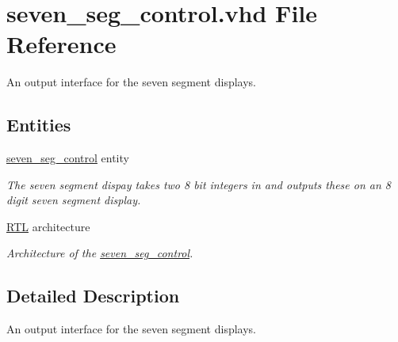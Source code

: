 \hypertarget{seven__seg__control_8vhd}{\section{seven\-\_\-seg\-\_\-control.\-vhd File Reference}
\label{seven__seg__control_8vhd}
}


An output interface for the seven segment displays.  


\subsection*{Entities}
\begin{DoxyCompactItemize}
\item 
\hyperlink{classseven__seg__control}{seven\-\_\-seg\-\_\-control} entity
\begin{DoxyCompactList}\small\item\em The seven segment dispay takes two 8 bit integers in and outputs these on an 8 digit seven segment display. \end{DoxyCompactList}\item 
\hyperlink{classseven__seg__control_1_1RTL}{R\-T\-L} architecture
\begin{DoxyCompactList}\small\item\em Architecture of the \hyperlink{classseven__seg__control}{seven\-\_\-seg\-\_\-control}. \end{DoxyCompactList}\end{DoxyCompactItemize}


\subsection{Detailed Description}
An output interface for the seven segment displays. 